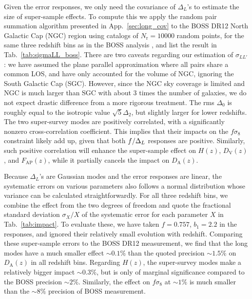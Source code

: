 \documentclass[a4paper,11pt]{article}
\let\d\relax
\DeclareMathOperator{\d}{d}
\newcommand{\Dist}[1]{D_\mathrm{#1}}
\newcommand{\FAP}{F_\mathrm{AP}}
\newcommand{\ran}{\mathrm{r}}
\begin{document}
Given the error responses, we only need the covariance of $\Delta_L$'s to
estimate the size of super-sample effects.
To compute this we apply the random pair summation algorithm presented in
App.~\ref{sec:long_cov} to the BOSS DR12 North Galactic Cap (NGC) region using
catalogs of $N_\ran=10000$ random points, for the same three redshift bins as
in the BOSS analysis \cite{AlamEtAl17}, and list the result in
Tab.~\ref{tab:sigmaLL_boss}.
There are two caveats regarding our estimation of $\sigma_{LL'}$: we have
assumed the plane parallel approximation where all pairs share a common LOS, and
have only accounted for the volume of NGC, ignoring the South Galactic Cap (SGC).
However, since the NGC sky coverage is limited and NGC is much larger
than SGC with about 3 times the number of galaxies, we do not expect drastic
difference from a more rigorous treatment.
The rms $\Delta_0$ is roughly equal to the isotropic value $\sqrt5\Delta_2$,
but slightly larger for lower redshifts.
The two super-survey modes are positively correlated, with a significantly
nonzero cross-correlation coefficient.
This implies that their impacts on the $f\sigma_8$ constraint likely add up, given that
both $\d f/\d\Delta_L$ responses are positive.
Similarly, such positive correlation will enhance the super-sample effect on
$H(z)$, $\Dist{V}(z)$, and $\FAP(z)$, while it partially cancels the
impact on $\Dist{A}(z)$.

Because $\Delta_L$'s are Gaussian modes and the error responses are linear, the
systematic errors on various parameters also follows a normal distribution
whose variance can be calculated straightforwardly.
For all three redshift bins, we combine the effect from the two degrees of
freedom and quote the fractional standard deviation $\sigma_X/X$ of the
systematic error for each parameter $X$ in Tab.~\ref{tab:impact}.
To evaluate these, we have taken $f=0.757$, $b_1=2.2$ in the responses, and
ignored their relatively small evolution with redshift.
Comparing these super-sample errors to the BOSS DR12 measurement, we find that
the long modes have a much smaller effect $\sim0.1\%$ than the quoted precision
$\sim1.5\%$ on $\Dist{A}(z)$ in all redshift bins.
Regarding $H(z)$, the super-survey modes make a relatively bigger impact
$\sim0.3\%$, but is only of marginal significance compared to the BOSS
precision $\sim2\%$.
Similarly, the effect on $f\sigma_8$ at $\sim1\%$ is much smaller than the $\sim8\%$
precision of BOSS measurement.
\end{document}
